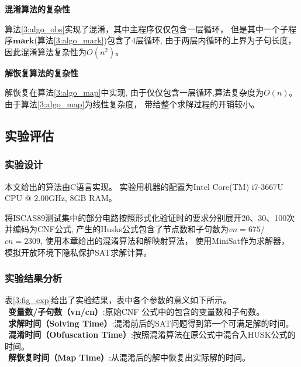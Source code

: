 \textbf{混淆算法的复杂性}

算法\ref{3:algo_obs}实现了混淆，其中主程序仅仅包含一层循环，
但是其中一个子程序$\mathbf{mark}$(算法\ref{3:algo_mark})包含了4层循环,
由于两层内循环的上界为子句长度，
因此混淆算法复杂性为$O(n^2)$。

\textbf{解恢复算法的复杂性}

解恢复在算法\ref{3:algo_map}中实现,
由于仅仅包含一层循环,算法复杂度为$O(n)$。
由于算法\ref{3:algo_map}为线性复杂度，
带给整个求解过程的开销较小。

\subsection{实验评估}
\subsubsection{实验设计}
本文给出的算法由C语言实现。
实验用机器的配置为Intel Core(TM) i7-3667U CPU @ 2.00GHz, 8GB RAM。

将ISCAS89测试集中的部分电路按照形式化验证时的要求分别展开20、30、100次并编码为CNF公式,
产生的Husks公式包含了节点数和子句数为$vn=675$/$cn=2309$,
使用本章给出的混淆算法和解映射算法，
使用MiniSat作为求解器，
模拟开放环境下隐私保护SAT求解计算。

\subsubsection{实验结果分析}
表\ref{3:fig_exp}给出了实验结果，表中各个参数的意义如下所示。 \\
$~~$\textbf{变量数/子句数（vn/cn）}:原始CNF 公式中的包含的变量数和子句数。\\
$~~$\textbf{求解时间（Solving Time）}:混淆前后的SAT问题得到第一个可满足解的时间。\\
$~~$\textbf{混淆时间（Obfuscation Time）}:按照混淆算法在原公式中混合入HUSK公式的时间。\\
$~~$\textbf{解恢复时间（Map Time）}:从混淆后的解中恢复出实际解的时间。

